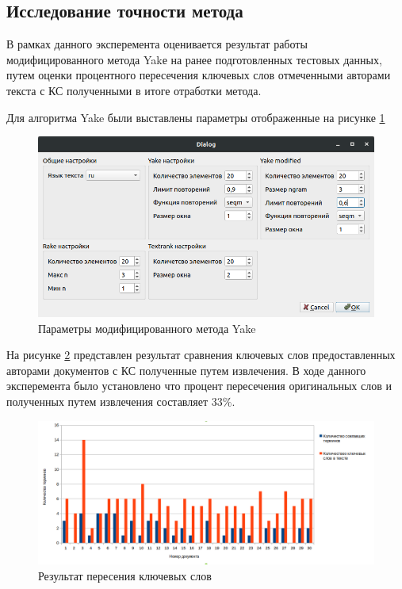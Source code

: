 \subsection{Исследование точности метода}
В рамках данного эксперемента оценивается результат работы модифицированного метода Yakе на ранее подготовленных тестовых данных, путем оценки процентного пересечения ключевых слов отмеченными авторами текста с КС полученными в итоге отработки метода.

Для алгоритма Yake были выставлены параметры отображенные на рисунке \ref{fig:experiment11}
\begin{figure}[!h]
	\centering
	\includegraphics[width=1\linewidth]{src/img/experiment/experiment_1_1}
	\caption{Параметры модифицированного метода Yake}
	\label{fig:experiment11}
\end{figure}

На рисунке \ref{fig:experiment12} представлен результат сравнения ключевых слов предоставленных авторами документов с КС полученные путем извлечения.
В ходе данного эксперемента было установлено что процент пересечения оригинальных слов и полученных путем извлечения составляет $33\%$.
\begin{figure}[!h]
	\centering
	\includegraphics[width=1\linewidth]{src/img/experiment/experiment_1_2}
	\caption{Результат пересения ключевых слов}
	\label{fig:experiment12}
\end{figure}

